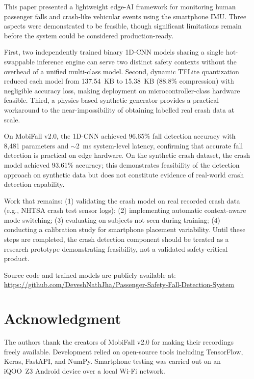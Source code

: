 \documentclass[12pt,a4paper]{article}
\begin{document}
This paper presented a lightweight edge-AI framework for monitoring human
passenger falls and crash-like vehicular events using the smartphone IMU.
Three aspects were demonstrated to be feasible, though significant limitations
remain before the system could be considered production-ready.

First, two independently trained binary 1D-CNN models sharing a single
hot-swappable inference engine can serve two distinct safety contexts without
the overhead of a unified multi-class model. Second, dynamic TFLite
quantization reduced each model from 137.54~KB to 15.38~KB (88.8\%
compression) with negligible accuracy loss, making deployment on
microcontroller-class hardware feasible. Third, a physics-based synthetic
generator provides a practical workaround to the near-impossibility of
obtaining labelled real crash data at scale.

On MobiFall v2.0, the 1D-CNN achieved 96.65\% fall detection accuracy with
8,481 parameters and $\sim$2~ms system-level latency, confirming that
accurate fall detection is practical on edge hardware. On the synthetic
crash dataset, the crash model achieved 93.61\% accuracy; this demonstrates
feasibility of the detection approach on synthetic data but does not
constitute evidence of real-world crash detection capability.

Work that remains: (1) validating the crash model on real recorded crash
data (e.g., NHTSA crash test sensor logs); (2) implementing automatic
context-aware mode switching; (3) evaluating on subjects not seen during
training; (4) conducting a calibration study for smartphone placement
variability. Until these steps are completed, the crash detection component
should be treated as a research prototype demonstrating feasibility, not a
validated safety-critical product.

Source code and trained models are publicly available at:\\
\url{https://github.com/DeveshNathJha/Passenger-Safety-Fall-Detection-System}

\section*{Acknowledgment}

The authors thank the creators of MobiFall v2.0 for making their recordings
freely available. Development relied on open-source tools including TensorFlow,
Keras, FastAPI, and NumPy. Smartphone testing was carried out on an iQOO~Z3
Android device over a local Wi-Fi network.



\end{document}

